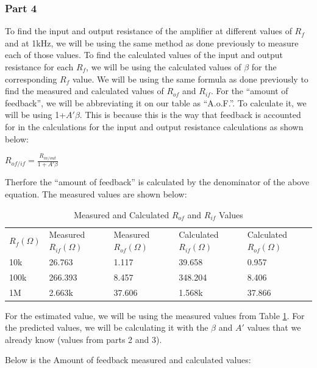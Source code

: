 \documentclass[12pt]{article}
\begin{document}
\subsubsection{Part 4}
To find the input and output resistance of the amplifier at different values of $R_f$ and 
at 1kHz, we will be using the same method as done previously to measure each of those values.
To find the calculated values of the input and output resistance for each $R_f$, we 
will be using the calculated values of $\beta$ for the corresponding $R_f$ value. We 
will be using the same formula as done previously to find the measured and calculated
values of $R_{of}$ and $R_{if}$. For the ``amount of feedback'', we will be abbreviating it on our table as ``A.o.F.''. 
To calculate it, we will be using 1+$A'\beta$. This is because this is the way that feedback is accounted for in the 
calculations for the input and output resistance calculations as shown below:
\begin{center}
$R_{of/if}=\frac{R_{in/out}}{1+A'\beta}$
\end{center}
Therfore the ``amount of feedback'' is calculated by the denominator of the above equation.
The measured values are shown below:

\begin{table}[h!]
    \centering
    \begin{tabular}{lllll}
    
    $R_f (\Omega)$ & Measured  $R_{if}(\Omega)$ & Measured $R_{of}(\Omega)$ & Calculated $R_{if}(\Omega)$ & Calculated  $R_{of}(\Omega)$ \\ \cline{1-5}
    10k & 26.763 & 1.117 & 39.658 & 0.957 \\ 
    100k & 266.393 & 8.457 & 348.204 & 8.406  \\
    1M & 2.663k & 37.606 & 1.568k & 37.866 
    \end{tabular}
    \caption{Measured and Calculated $R_{of}$ and $R_{if}$ Values}
    \label{tab:measuredcalcrifrof}
\end{table}

For the estimated value, we will be using the measured values from Table \ref{tab:measuredcalcrifrof}. For the predicted 
values, we will be calculating it with the $\beta$ and $A'$ values that we already know (values from parts 2 and 3).

Below is the Amount of feedback measured and calculated values:
\end{document}
